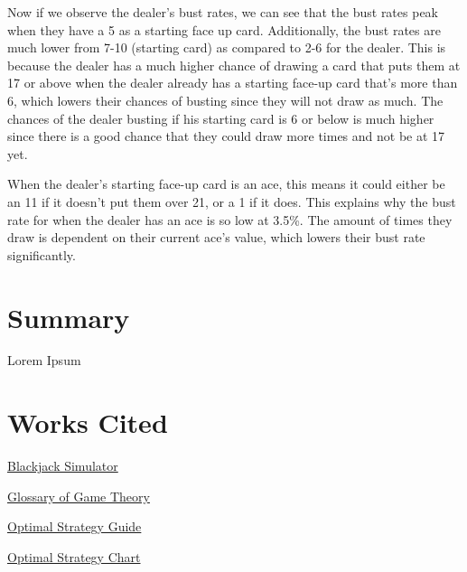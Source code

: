 \documentclass{article}
\begin{document}
        \vspace{0.25cm}

        \hspace{-0.5cm}Now if we observe the dealer's bust rates, we can see that the bust rates peak when they have a 5 as a starting face up card. Additionally, the bust rates are much lower from 7-10 (starting card) as compared to 2-6 for the dealer. This is because the dealer has a much higher chance of drawing a card that puts them at 17 or above when the dealer already has a starting face-up card that's more than 6, which lowers their chances of busting since they will not draw as much. The chances of the dealer busting if his starting card is 6 or below is much higher since there is a good chance that they could draw more times and not be at 17 yet. 

        \vspace{0.25cm}

        \hspace{-0.5cm}When the dealer's starting face-up card is an ace, this means it could either be an 11 if it doesn't put them over 21, or a 1 if it does. This explains why the bust rate for when the dealer has an ace is so low at 3.5\%. The amount of times they draw is dependent on their current ace's value, which lowers their bust rate significantly.
        

\section{Summary}
\label{sec: Summary}

	Lorem Ipsum	

\section{Works Cited}
\label{sec: Works Cited}

\href{https://github.com/hosua/blackjack-cs241}{Blackjack Simulator}

\href{https://en.wikipedia.org/wiki/Glossary_of_game_theory}{Glossary of Game Theory}

\href{https://www.kjartan.co.uk/games/blackjack.htm}{Optimal Strategy Guide}

\href{https://www.kjartan.co.uk/games/pix/cards/Blackjack%20full%20guide.pdf}{Optimal Strategy Chart}
\end{document}
